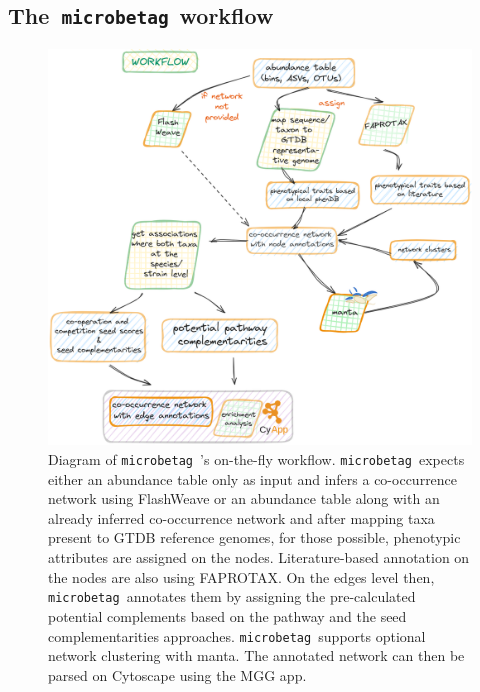 \documentclass[sn-mathphys,Numbered]{sn-jnl}  %
\theoremstyle{thmstyleone}%
\theoremstyle{thmstyletwo}%
\theoremstyle{thmstylethree}%
\newcommand{\microbetag}{\texttt{microbetag }}
\begin{document}
    \subsection*{The~\microbetag workflow}
    \label{subsec:app}
        \begin{figure}[h!]
            \includegraphics[width=0.9\columnwidth]{figs/microbetag-wf.png}
            \caption{
                Diagram of \microbetag's on-the-fly workflow. 
                \microbetag expects either an abundance table only as input and infers a co-occurrence network using FlashWeave 
                or an abundance table along with an already inferred co-occurrence network 
                and after mapping taxa present to GTDB reference genomes, for those possible, phenotypic attributes are assigned on the nodes. 
                Literature-based annotation on the nodes are also using FAPROTAX.
                On the edges level then, \microbetag annotates them by assigning the pre-calculated potential complements based on the pathway and the seed complementarities approaches. 
                \microbetag supports optional network clustering with manta.
                The annotated network can then be parsed on Cytoscape using the MGG app.
            }
            \label{fig:wf}
        \end{figure}
\end{document}
